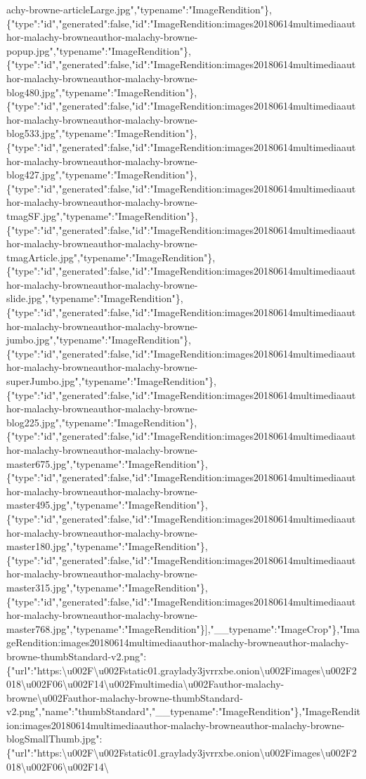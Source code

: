 achy-browne-articleLarge.jpg","typename":"ImageRendition"\},\{"type":"id","generated":false,"id":"ImageRendition:images20180614multimediaauthor-malachy-browneauthor-malachy-browne-popup.jpg","typename":"ImageRendition"\},\{"type":"id","generated":false,"id":"ImageRendition:images20180614multimediaauthor-malachy-browneauthor-malachy-browne-blog480.jpg","typename":"ImageRendition"\},\{"type":"id","generated":false,"id":"ImageRendition:images20180614multimediaauthor-malachy-browneauthor-malachy-browne-blog533.jpg","typename":"ImageRendition"\},\{"type":"id","generated":false,"id":"ImageRendition:images20180614multimediaauthor-malachy-browneauthor-malachy-browne-blog427.jpg","typename":"ImageRendition"\},\{"type":"id","generated":false,"id":"ImageRendition:images20180614multimediaauthor-malachy-browneauthor-malachy-browne-tmagSF.jpg","typename":"ImageRendition"\},\{"type":"id","generated":false,"id":"ImageRendition:images20180614multimediaauthor-malachy-browneauthor-malachy-browne-tmagArticle.jpg","typename":"ImageRendition"\},\{"type":"id","generated":false,"id":"ImageRendition:images20180614multimediaauthor-malachy-browneauthor-malachy-browne-slide.jpg","typename":"ImageRendition"\},\{"type":"id","generated":false,"id":"ImageRendition:images20180614multimediaauthor-malachy-browneauthor-malachy-browne-jumbo.jpg","typename":"ImageRendition"\},\{"type":"id","generated":false,"id":"ImageRendition:images20180614multimediaauthor-malachy-browneauthor-malachy-browne-superJumbo.jpg","typename":"ImageRendition"\},\{"type":"id","generated":false,"id":"ImageRendition:images20180614multimediaauthor-malachy-browneauthor-malachy-browne-blog225.jpg","typename":"ImageRendition"\},\{"type":"id","generated":false,"id":"ImageRendition:images20180614multimediaauthor-malachy-browneauthor-malachy-browne-master675.jpg","typename":"ImageRendition"\},\{"type":"id","generated":false,"id":"ImageRendition:images20180614multimediaauthor-malachy-browneauthor-malachy-browne-master495.jpg","typename":"ImageRendition"\},\{"type":"id","generated":false,"id":"ImageRendition:images20180614multimediaauthor-malachy-browneauthor-malachy-browne-master180.jpg","typename":"ImageRendition"\},\{"type":"id","generated":false,"id":"ImageRendition:images20180614multimediaauthor-malachy-browneauthor-malachy-browne-master315.jpg","typename":"ImageRendition"\},\{"type":"id","generated":false,"id":"ImageRendition:images20180614multimediaauthor-malachy-browneauthor-malachy-browne-master768.jpg","typename":"ImageRendition"\}{]},"\_\_typename":"ImageCrop"\},"ImageRendition:images20180614multimediaauthor-malachy-browneauthor-malachy-browne-thumbStandard-v2.png":\{"url":"https:\textbackslash{}u002F\textbackslash{}u002Fstatic01.graylady3jvrrxbe.onion\textbackslash{}u002Fimages\textbackslash{}u002F2018\textbackslash{}u002F06\textbackslash{}u002F14\textbackslash{}u002Fmultimedia\textbackslash{}u002Fauthor-malachy-browne\textbackslash{}u002Fauthor-malachy-browne-thumbStandard-v2.png","name":"thumbStandard","\_\_typename":"ImageRendition"\},"ImageRendition:images20180614multimediaauthor-malachy-browneauthor-malachy-browne-blogSmallThumb.jpg":\{"url":"https:\textbackslash{}u002F\textbackslash{}u002Fstatic01.graylady3jvrrxbe.onion\textbackslash{}u002Fimages\textbackslash{}u002F2018\textbackslash{}u002F06\textbackslash{}u002F14\textbackslash